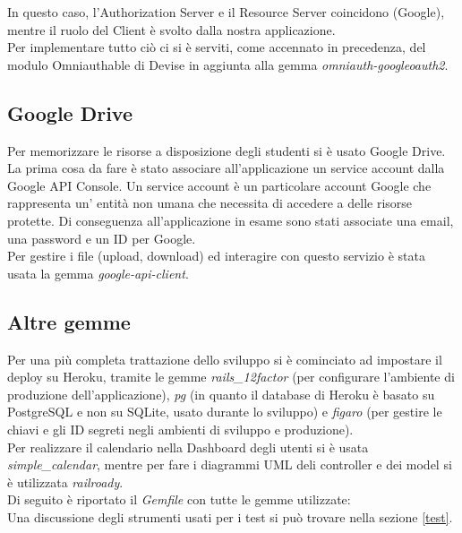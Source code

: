 \documentclass[Lau, binding=0.6cm, oneside]{sapthesis}
\begin{document}
In questo caso, l’Authorization Server e il Resource Server coincidono (Google), mentre il ruolo del Client è svolto dalla nostra applicazione.\\
Per implementare tutto ciò ci si è serviti, come accennato in precedenza, del modulo Omniauthable di Devise in aggiunta alla gemma \textit{omniauth-googleoauth2}.

\subsection{Google Drive}

Per memorizzare le risorse a disposizione degli studenti si è usato Google Drive.\\
La prima cosa da fare è stato associare all'applicazione un service account dalla Google API Console. Un service account è un particolare account Google che rappresenta un' entità non umana che necessita di accedere a delle risorse protette. Di conseguenza all'applicazione in esame sono stati associate una email, una password e un ID per Google.\\
Per gestire i file (upload, download) ed interagire con questo servizio è stata usata la gemma \textit{google-api-client}.

\subsection{Altre gemme}

Per una più completa trattazione dello sviluppo si è cominciato ad impostare il deploy su Heroku, tramite le gemme \textit{rails\_12factor} (per configurare l'ambiente di produzione dell'applicazione), \textit{pg} (in quanto il database di Heroku è basato su PostgreSQL e non su SQLite, usato durante lo sviluppo) e \textit{figaro} (per gestire le chiavi e gli ID segreti negli ambienti di sviluppo e produzione).\\
Per realizzare il calendario nella Dashboard degli utenti si è usata \textit{simple\_calendar}, mentre per fare i diagrammi UML deli controller e dei model si è utilizzata \textit{railroady}.\\
Di seguito è riportato il \textit{Gemfile} con tutte le gemme utilizzate:\\



Una discussione degli strumenti usati per i test si può trovare nella sezione \ref{test}.\\
\end{document}
